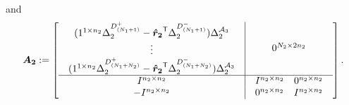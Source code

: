 and
\begin{equation*}
\mathbf{\boldsymbol{A_2}}:=\left[
\begin{array}{c|c}
\begin{array}{c}
		(1^{1 \times n_2}\Delta_2^{D_{(N_1 + 1)}^+}   - \mathbf{\boldsymbol{\hat{r}_2}}^{\mbox{\scriptsize\sf T}} \Delta_2^{D_{(N_1 + 1)}^-} )\Delta_2^{{\cal A}_3}\\
		\vdots\\
		(1^{1 \times n_2}\Delta_2^{D_{(N_1 + N_2)}^+}   - \mathbf{\boldsymbol{\hat{r}_2}}^{\mbox{\scriptsize\sf T}} \Delta_2^{D_{(N_1 + N_2)}^-} )\Delta_2^{{\cal A}_3}
\end{array}
&	0^{N_2 \times 2 n_2}\\	\hline
I^{n_2 \times n_2}	&	\begin{array}{cc}
					I^{n_2 \times n_2}	& 0^{n_2 \times n_2}
						\end{array}\\
-I^{n_2 \times n_2}	&	\begin{array}{cc}
					0^{n_2 \times n_2}	& I^{n_2 \times n_2}
						\end{array}
\end{array}
\right].
\end{equation*}%
